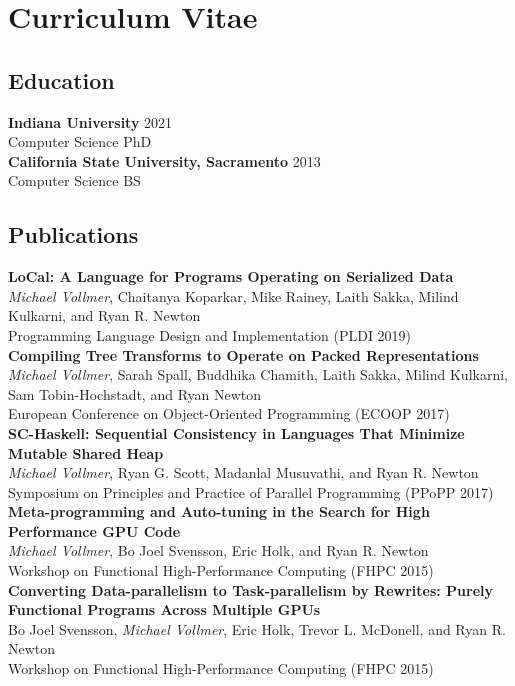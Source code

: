 \chapter*{Curriculum Vitae}
%
\setlength{\parindent}{0pt}

\section*{Education}
\textbf{Indiana University} \hfill 2021 \\
Computer Science PhD  \\
\textbf{California State University, Sacramento} \hfill 2013 \\
Computer Science BS  \\
\thispagestyle{empty}

\section*{Publications}
{\bf LoCal: A Language for Programs Operating on Serialized Data} \\
\emph{Michael Vollmer}, Chaitanya Koparkar, Mike Rainey, Laith Sakka, Milind Kulkarni, and Ryan R. Newton \\
Programming Language Design and Implementation (PLDI 2019) \\
 {\bf Compiling Tree Transforms to Operate on Packed Representations}\\
\emph{Michael Vollmer}, Sarah Spall, Buddhika Chamith, Laith Sakka, Milind Kulkarni, Sam Tobin-Hochstadt, and Ryan Newton \\
European Conference on Object-Oriented Programming (ECOOP 2017) \\
{\bf SC-Haskell: Sequential Consistency in Languages That Minimize Mutable Shared Heap}  \\
\emph{Michael Vollmer}, Ryan G. Scott, Madanlal Musuvathi, and Ryan R. Newton \\
Symposium on Principles and Practice of Parallel Programming (PPoPP 2017) \\
{\bf Meta-programming and Auto-tuning in the Search for High Performance GPU Code}  \\
\emph{Michael Vollmer}, Bo Joel Svensson, Eric Holk, and Ryan R. Newton \\
Workshop on Functional High-Performance Computing (FHPC 2015) \\
{\bf Converting Data-parallelism to Task-parallelism by Rewrites: Purely Functional Programs Across Multiple GPUs} \\
Bo Joel Svensson, \emph{Michael Vollmer}, Eric Holk, Trevor L. McDonell, and Ryan R. Newton \\
Workshop on Functional High-Performance Computing (FHPC 2015) \\

\thispagestyle{empty}
